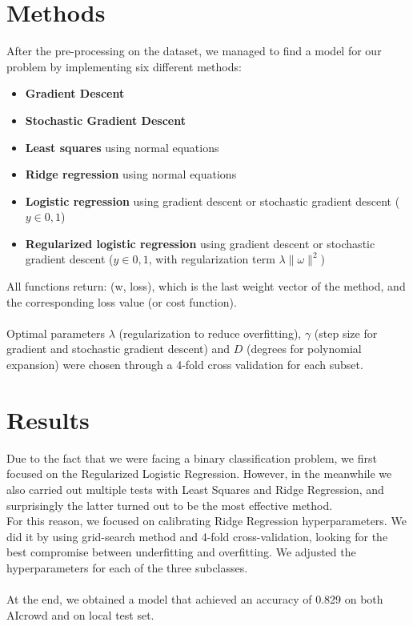 \documentclass[10pt,conference,compsocconf]{IEEEtran}
\begin{document}
\section{Methods}
After the pre-processing on the dataset, we managed to find a model for our problem by implementing six different methods:
\begin{itemize}
    \item \textbf{Gradient Descent}
    \item \textbf{Stochastic Gradient Descent}
    \item \textbf{Least squares} using normal equations
    \item \textbf{Ridge regression} using normal equations
    \item \textbf{Logistic regression} using gradient descent or stochastic gradient descent ($y \in {0,1}$)
    \item \textbf{Regularized logistic regression} using gradient descent or stochastic gradient descent ($y \in {0,1}$, with regularization term $ \lambda  \| \omega \|^2$)
\end{itemize}
All functions return: (w, loss), which is the last weight vector of the
method, and the corresponding loss value (or cost function).\\
\vspace{0.05cm}\\
Optimal parameters $\lambda$ (regularization to reduce overfitting), $\gamma$ (step size for gradient and stochastic gradient descent) and $D$ (degrees for polynomial expansion) were chosen through a 4-fold cross validation for each subset.



\section{Results}
Due to the fact that we were facing a binary classification problem, we first focused on the Regularized Logistic Regression. However, in the meanwhile we also carried out multiple tests with Least Squares and Ridge Regression, and surprisingly the latter turned out to be the most effective method.\\
For this reason, we focused on calibrating Ridge Regression hyperparameters. We did it by using grid-search method and 4-fold cross-validation, looking for the best compromise between underfitting and overfitting. We adjusted the hyperparameters for
each of the three subclasses.\\
\vspace{0.05cm}\\
At the end, we obtained a model that achieved an accuracy of 0.829 on both AIcrowd and on local test set.
\end{document}
